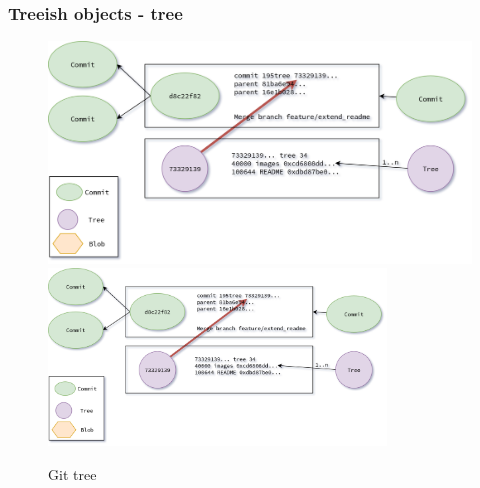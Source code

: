 \begin{frame}
    \frametitle{Treeish objects - tree}
    \begin{figure}
        \begin{center}
            {
                \includegraphics[height=0.70\textheight,keepaspectratio]{./images/Treeish_Tree.png}
            }
            {
                \includegraphics[height=0.6\textheight,width=0.8\textwidth]{./images/Treeish_Tree.png}
            }
            \caption{Git tree}
        \end{center}
    \end{figure}
\end{frame}

